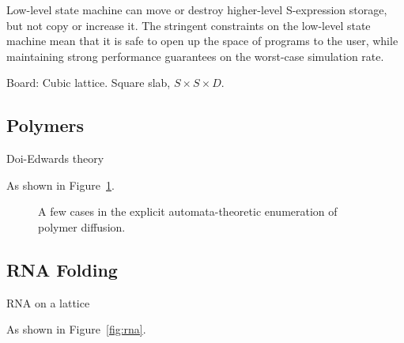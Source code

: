 \documentclass{acm_proc_article-sp}
\begin{document}
Low-level state machine can move or destroy higher-level S-expression storage, but not copy or increase it.
The stringent constraints on the low-level state machine mean that it is safe to open up the space of programs to the user,
while maintaining strong performance guarantees on the worst-case simulation rate.

Board:
Cubic lattice.
Square slab, $S \times S \times D$.


\subsection{Polymers}

Doi-Edwards theory \cite{DoiEdwards1988}

As shown in Figure~\ref{fig:polymer}.

\begin{figure}
\caption{
\label{fig:polymer}
A few cases in the explicit automata-theoretic enumeration of polymer diffusion.
}
\end{figure}


\subsection{RNA Folding}

RNA on a lattice \cite{LeoniVanderzande2003,JostEveraers2010,ZaraPretti2007,GillespieMayneJiang2009}


As shown in Figure~\ref{fig:rna}.
\end{document}
